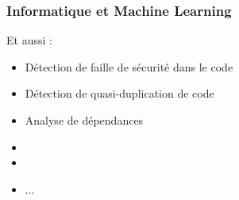 \begin{frame}
  \frametitle{Informatique et Machine Learning}
  Et aussi :
  \begin{itemize}
  \item Détection de faille de sécurité dans le code
  \item Détection de quasi-duplication de code
  \item Analyse de dépendances
  \item {}
  \item {}
  \item ...
  \end{itemize}
\end{frame}
